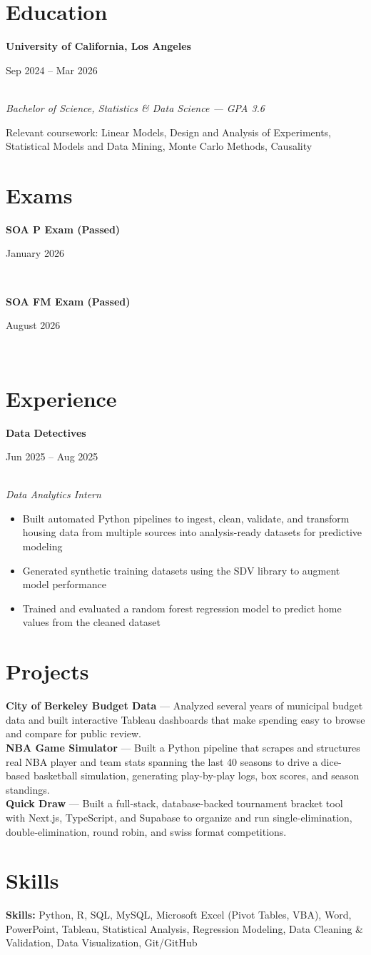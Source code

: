 \documentclass[11pt,letterpaper]{article}
\newcommand{\entry}[3]{%
  \noindent\begin{minipage}[t]{0.72\textwidth}\raggedright\textbf{#1}\end{minipage}%
  \hfill\begin{minipage}[t]{0.26\textwidth}\raggedleft\small\color{gray}#2\end{minipage}\\
  \textit{#3}\par\vspace{2pt}
}
\newcommand{\examentry}[2]{%
  \noindent\begin{minipage}[t]{0.72\textwidth}\raggedright\textbf{#1}\end{minipage}%
  \hfill\begin{minipage}[t]{0.26\textwidth}\raggedleft\small\color{gray}#2\end{minipage}\\[1pt]
}
\begin{document}


\vspace{4pt}

\section*{Education}
\entry{University of California, Los Angeles}{Sep 2024 -- Mar 2026}{Bachelor of Science, Statistics \& Data Science --- GPA 3.6}
\small Relevant coursework: Linear Models, Design and Analysis of Experiments, Statistical Models and Data Mining, Monte Carlo Methods, Causality

\section*{Exams}
\examentry{SOA P Exam (Passed)}{January 2026}
\examentry{SOA FM Exam (Passed)}{August 2026}

\section*{Experience}



\entry{Data Detectives}{Jun 2025 -- Aug 2025}{Data Analytics Intern}
\begin{itemize}
  \item Built automated Python pipelines to ingest, clean, validate, and transform housing data from multiple sources into analysis-ready datasets for predictive modeling
  \item Generated synthetic training datasets using the SDV library to augment model performance
  \item Trained and evaluated a random forest regression model to predict home values from the cleaned dataset
\end{itemize}



\section*{Projects}
\textbf{City of Berkeley Budget Data} --- Analyzed several years of municipal budget data and built interactive Tableau dashboards that make spending easy to browse and compare for public review.\\[4pt]
\textbf{NBA Game Simulator} --- Built a Python pipeline that scrapes and structures real NBA player and team stats spanning the last 40 seasons to drive a dice-based basketball simulation, generating play-by-play logs, box scores, and season standings.\\[4pt]
\textbf{Quick Draw} --- Built a full-stack, database-backed tournament bracket tool with Next.js, TypeScript, and Supabase to organize and run single-elimination, double-elimination, round robin, and swiss format competitions.

\section*{Skills}
\textbf{Skills:} Python, R, SQL, MySQL, Microsoft Excel (Pivot Tables, VBA), Word, PowerPoint, Tableau, Statistical Analysis, Regression Modeling, Data Cleaning \& Validation, Data Visualization, Git/GitHub
\end{document}

